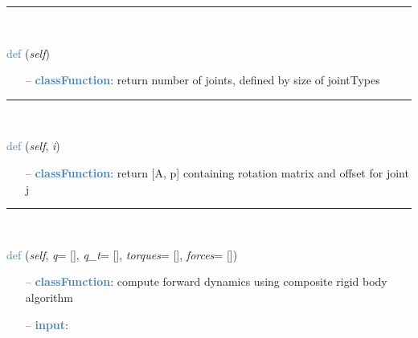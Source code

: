 \begin{itemize}[leftmargin=1.4cm]
\begin{itemize}[leftmargin=1.4cm]
\begin{itemize}[leftmargin=0.5cm]
\begin{itemize}[leftmargin=1.4cm]
\begin{itemize}[leftmargin=1.4cm]
\begin{itemize}[leftmargin=0.5cm]
\begin{itemize}[leftmargin=1.4cm]
\begin{itemize}[leftmargin=0.5cm]
\begin{itemize}[leftmargin=1.4cm]
\begin{itemize}[leftmargin=1.4cm]
\begin{itemize}[leftmargin=1.4cm]
%
\noindent\rule{8cm}{0.75pt}\vspace{1pt} \\ 
\begin{flushleft}
\noindent \textcolor{steelblue}{def {\bf {}}}\label{sec:kinematicTree:KinematicTree33:Size}
({\it self})
\end{flushleft}
\setlength{\itemindent}{0.7cm}
\begin{itemize}[leftmargin=0.7cm]
\item[--]\textcolor{steelblue}{\bf classFunction}: return number of joints, defined by size of jointTypes
\vspace{12pt}\end{itemize}
%
\noindent\rule{8cm}{0.75pt}\vspace{1pt} \\ 
\begin{flushleft}
\noindent \textcolor{steelblue}{def {\bf {}}}\label{sec:kinematicTree:KinematicTree33:XL}
({\it self}, {\it i})
\end{flushleft}
\setlength{\itemindent}{0.7cm}
\begin{itemize}[leftmargin=0.7cm]
\item[--]\textcolor{steelblue}{\bf classFunction}: return [A, p] containing rotation matrix and offset for joint j
\vspace{12pt}\end{itemize}
%
\noindent\rule{8cm}{0.75pt}\vspace{1pt} \\ 
\begin{flushleft}
\noindent \textcolor{steelblue}{def {\bf {}}}\label{sec:kinematicTree:KinematicTree33:ForwardDynamicsCRB}
({\it self}, {\it q}= [], {\it q\_t}= [], {\it torques}= [], {\it forces}= [])
\end{flushleft}
\setlength{\itemindent}{0.7cm}
\begin{itemize}[leftmargin=0.7cm]
\item[--]\textcolor{steelblue}{\bf classFunction}: compute forward dynamics using composite rigid body algorithm
\item[--]\textcolor{steelblue}{\bf input}: \vspace{-6pt}
\begin{itemize}[leftmargin=1.2cm]

\end{itemize}
\end{itemize}
\end{itemize}
\end{itemize}
\end{itemize}
\end{itemize}
\end{itemize}
\end{itemize}
\end{itemize}
\end{itemize}
\end{itemize}
\end{itemize}
\end{itemize}

